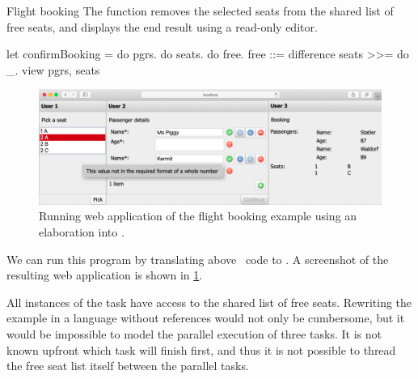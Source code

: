 \begin{example}{Flight booking}
  The function  removes the selected seats from the shared list of free seats,
  and displays the end result using a read-only editor.
  \begin{TASK}[emph={name,age,seats,pgrs,free}]
    let confirmBooking = do pgrs. do seats. do free.
      free ::= difference seats >>= do  _.
      view {pgrs, seats}
  \end{TASK}

  \begin{figure}
    \label{fig:flight-booking}
    \includegraphics[width=\columnwidth]{figures/flight-booking.png}
    \caption{Running web application of the flight booking example using an elaboration into \ITASKS.}
  \end{figure}

  We can run this program by translating above \TOPHAT\ code to \ITASKS.
  A screenshot of the resulting web application is shown in \cref{fig:flight-booking}.

  All instances of the  task have access to the shared list of free seats.
  Rewriting the example in a language without references would not only be cumbersome,
  but it would be impossible to model the parallel execution of three  tasks.
  It is not known upfront which task will finish first,
  and thus it is not possible to thread the free seat list itself between the parallel tasks.
\end{example}

